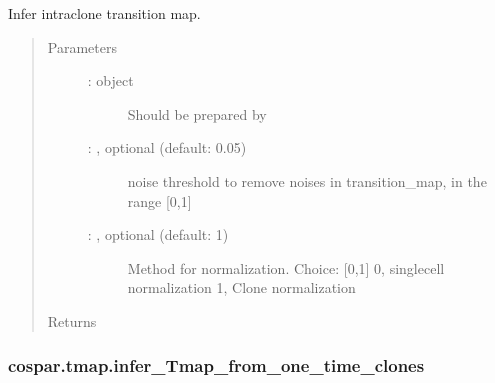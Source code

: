 \documentclass[letterpaper,10pt,english]{sphinxmanual}
\begin{document}
\begin{fulllineitems}
\label{\detokenize{cospar.tmap.infer_intraclone_Tmap:cospar.tmap.infer_intraclone_Tmap}}
Infer intra\sphinxhyphen{}clone transition map.
\begin{quote}\begin{description}
\item[{Parameters}] \leavevmode\begin{description}
\item[{ :  object}] \leavevmode
Should be prepared by {\hyperref[\detokenize{cospar.tmap.select_time_points:cospar.tmap.select_time_points}]{}}

\item[{ : , optional (default: 0.05)}] \leavevmode
noise threshold to remove noises in transition\_map,
in the range {[}0,1{]}

\item[{ : , optional (default: 1)}] \leavevmode
Method for normalization. Choice: {[}0,1{]}
0, single\sphinxhyphen{}cell normalization
1, Clone normalization

\end{description}

\item[{Returns}] \leavevmode
{}

\end{description}\end{quote}

\end{fulllineitems}



\subsubsection{cospar.tmap.infer\_Tmap\_from\_one\_time\_clones}
\label{\detokenize{cospar.tmap.infer_Tmap_from_one_time_clones:cospar-tmap-infer-tmap-from-one-time-clones}}\label{\detokenize{cospar.tmap.infer_Tmap_from_one_time_clones::doc}}
\end{document}
